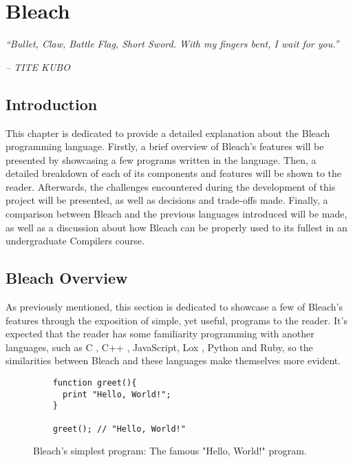 \chapter{Bleach} \label{cap:metodologia}

\begin{displayquote}
    \begin{center}
        \textit{``Bullet, Claw, Battle Flag, Short Sword. With my fingers bent, I wait for you.''}
    \end{center}
\end{displayquote}

\begin{flushright}
   \textit{-- TITE KUBO}
\end{flushright}

\section{Introduction}
This chapter is dedicated to provide a detailed explanation about the Bleach programming language. Firstly, a brief overview of Bleach's features will be presented by showcasing a few programs written in the language. Then, a detailed breakdown of each of its components and features will be shown to the reader. Afterwards, the challenges encountered during the development of this project will be presented, as well as decisions and trade-offs made. Finally, a comparison between Bleach and the previous languages introduced will be made, as well as a discussion about how Bleach can be properly used to its fullest in an undergraduate Compilers course.

\section{Bleach Overview}
As previously mentioned, this section is dedicated to showcase a few of Bleach's features through the exposition of simple, yet useful, programs to the reader. It's expected that the reader has some familiarity programming with another languages, such as C \cite{kernighan1988c}, C++ \cite{strousrup2000c++}, JavaScript, Lox \cite{nystrom2021crafting}, Python \cite{python_language} and Ruby, so the similarities between Bleach and these languages make themselves more evident. \newline

\begin{figure}
    \centering
    \begin{lstlisting}
    function greet(){
      print "Hello, World!";
    }
    
    greet(); // "Hello, World!"
    \end{lstlisting}
    \caption{Bleach's simplest program: The famous "Hello, World!" program.}
\end{figure}

